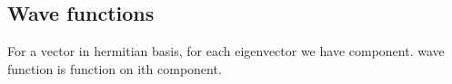 
\subsection{Wave functions}

For a vector in hermitian basis, for each eigenvector we have component. wave function is function on ith component.

